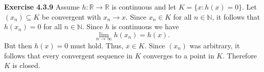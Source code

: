 \documentclass[12pt]{article}
\begin{document}
\textbf{Exercise 4.3.9}
Assume \( h: \mathbb{R} \to \mathbb{R} \) is continuous and let \( K = \{x: h(x) = 0\} \). Let \( (x_n) \subseteq K \) be convergent with \( x_n \to x \). Since \( x_n \in K \) for all \( n \in \mathbb{N} \), it follows that \( h(x_n) = 0 \) for all \(  n \in \mathbb{N} \). Since \( h \) is continuous we have
\[
    \lim_{n \to \infty} h(x_n) = h(x).
\]
But then \( h(x) = 0 \) must hold. Thus, \( x \in K \). Since \( (x_n) \) was arbitrary, it follows that every convergent sequence in \( K \) converges to a point in \( K \). Therefore \( K \) is closed.
\end{document}
